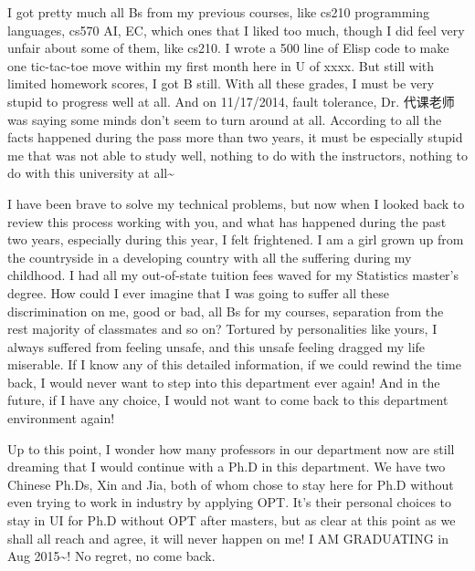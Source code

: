 \documentclass[12pt]{book}
\begin{document}
I got pretty much all Bs from my previous courses, like cs210 programming languages, cs570 AI, EC, which ones that I liked too much, though I did feel very unfair about some of them, like cs210. I wrote a 500 line of Elisp code to make one tic-tac-toe move within my first month here in U of xxxx. But still with limited homework scores, I got B still. With all these grades, I must be very stupid to progress well at all. And on 11/17/2014, fault tolerance, Dr. 代课老师 was saying some minds don't seem to turn around at all. According to all the facts happened during the pass more than two years, it must be especially stupid me that was not able to study well, nothing to do with the instructors, nothing to do with this university at all\textasciitilde{}

I have been brave to solve my technical problems, but now when I looked back to review this process working with you, and what has happened during the past two years, especially during this year, I felt frightened. I am a girl grown up from the countryside in a developing country with all the suffering during my childhood. I had all my out-of-state tuition fees waved for my Statistics master's degree. How could I ever imagine that I was going to suffer all these discrimination on me, good or bad, all Bs for my courses, separation from the rest majority of classmates and so on? Tortured by personalities like yours, I always suffered from feeling unsafe, and this unsafe feeling dragged my life miserable. If I know any of this detailed information, if we could rewind the time back, I would never want to step into this department ever again! And in the future, if I have any choice, I would not want to come back to this department environment again! 

Up to this point, I wonder how many professors in our department now are still dreaming that I would continue with a Ph.D in this department. We have two Chinese Ph.Ds, Xin and Jia, both of whom chose to stay here for Ph.D without even trying to work in industry by applying OPT. It's their personal choices to stay in UI for Ph.D without OPT after masters, but as clear at this point as we shall all reach and agree, it will never happen on me! I AM GRADUATING in Aug 2015\textasciitilde{}! No regret, no come back. 
\end{document}
